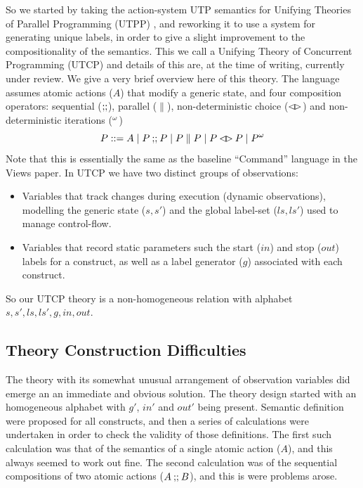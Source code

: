 So we started by taking the action-system UTP semantics for Unifying Theories
of Parallel Programming (UTPP) \cite{DBLP:conf/icfem/WoodcockH02},
and reworking it to use a system for generating unique labels,
in order to give a slight improvement to the compositionality
of the semantics. This we call a Unifying Theory of Concurrent Programming
(UTCP) and details of this are,
at the time of writing,
currently under review\cite{conf/tase/BMN165}.
We give a very brief overview here of this theory.
The language assumes atomic actions ($A$) that modify a generic state,
and four composition operators: sequential ($\mathrel{\mathbf{;\!;}}$), parallel ($\parallel$),
non-deterministic choice ($\mathbin{\lhd\!\rhd}$) and non-deterministic iterations (${}^{\omega}$)
\[
   P ::= A \mid P \mathbin{\mathbf{;\!;}} P \mid P \parallel P \mid P \mathbin{\lhd\!\rhd} P \mid {P}^{\omega}
\]
Note that this is essentially the same as the baseline ``Command'' language
in the Views paper\cite{conf/popl/Dinsdale-YoungBGPY13}.
In UTCP we have two distinct groups of observations:
\begin{itemize}
  \item
    Variables that track changes during execution
    (dynamic observations),
    modelling the generic state ($s,s'$)
    and the global label-set ($ls,ls'$) used to manage control-flow.
  \item
    Variables that record static parameters such the start ($in$)
    and stop ($out$) labels for a construct,
    as well as a label generator ($g$) associated with each construct.
\end{itemize}
So our UTCP theory is a non-homogeneous relation with alphabet $s,s',ls,ls',g,in,out$.


\subsection{Theory Construction Difficulties}\label{ssec:difficulties}

The theory with its somewhat unusual arrangement of observation variables
did emerge an an immediate and obvious solution.
The theory design started with an homogeneous alphabet with $g'$, $in'$ and $out'$
being present. Semantic definition were proposed for all constructs,
and then a series of calculations were undertaken in order to check
the validity of those definitions.
The first such calculation was that of the semantics of a single atomic
action ($A$), and this always seemed to work out fine.
The second calculation was of the sequential compositions of two atomic
actions ($A\mathbin{\mathbf{;\!;}} B$), and this is were problems arose.

